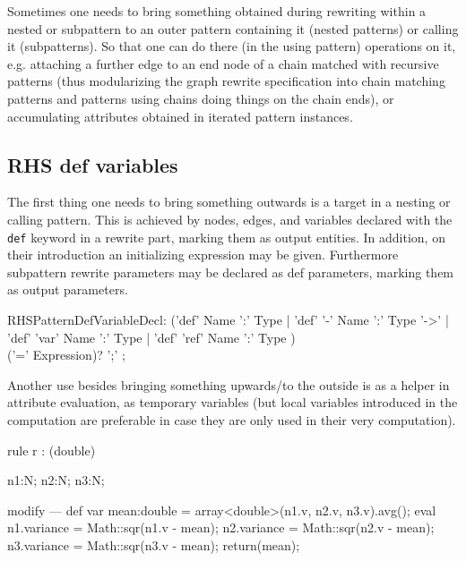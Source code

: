 Sometimes one needs to bring something obtained during rewriting within a nested or subpattern to an outer pattern containing it (nested patterns) or calling it (subpatterns).
So that one can do there (in the using pattern) operations on it, e.g. attaching a further edge to an end node of a chain matched with recursive patterns (thus modularizing the graph rewrite specification into chain matching patterns and patterns using chains doing things on the chain ends), or accumulating attributes obtained in iterated pattern instances. 

\subsection{RHS def variables} 

The first thing one needs to bring something outwards is a target in a nesting or calling pattern. 
This is achieved by nodes, edges, and variables declared with the \texttt{def} keyword in a rewrite part, marking them as output entities.
In addition, on their introduction an initializing expression may be given.
Furthermore subpattern rewrite parameters may be declared as def parameters,
marking them as output parameters.

\begin{rail} 
  RHSPatternDefVariableDecl: 
	('def' Name ':' Type |
	'def' '-' Name ':' Type '->' |
	'def' 'var' Name ':' Type |
	'def' 'ref' Name ':' Type ) \\
	('=' Expression)? ';'
	;
\end{rail}

Another use besides bringing something upwards/to the outside is as a helper in attribute evaluation,
as temporary variables (but local variables introduced in the computation are preferable in case they are only used in their very computation).

\begin{example}
  \begin{grgen}
rule r : (double) {
  n1:N; n2:N; n3:N;
  
  modify {
  ---
    def var mean:double = array<double>(n1.v, n2.v, n3.v).avg();
    eval {
      n1.variance = Math::sqr(n1.v - mean); 
      n2.variance = Math::sqr(n2.v - mean); 
      n3.variance = Math::sqr(n3.v - mean); 
    }
    return(mean);
  }
}
  \end{grgen}
\end{example}

